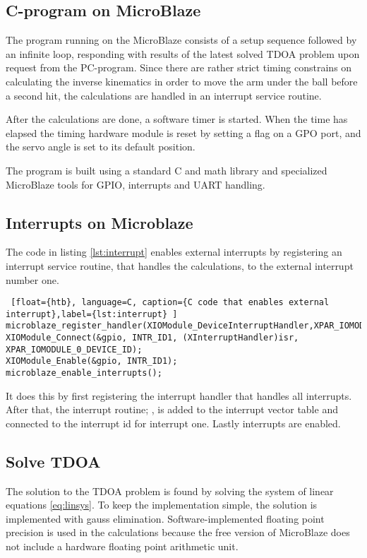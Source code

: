 \subsection{C-program on MicroBlaze}
The program running on the MicroBlaze consists of a setup sequence followed by an infinite loop, responding with results of the latest solved TDOA problem upon request from the PC-program. Since there are rather strict timing constrains on calculating the inverse kinematics in order to move the arm under the ball before a second hit, the calculations are handled in an interrupt service routine.

After the calculations are done, a software timer is started. When the time has elapsed the timing hardware module is reset by setting a flag on a GPO port, and the servo angle is set to its default position.

The program is built using a standard C and math library and specialized MicroBlaze tools for GPIO, interrupts and UART handling.
%
\subsection{Interrupts on Microblaze}
The code in listing \ref{lst:interrupt} enables external interrupts by registering an interrupt service routine, that handles the calculations, to the external interrupt number one.
%
\begin{lstlisting} [float={htb}, language=C, caption={C code that enables external interrupt},label={lst:interrupt} ]
microblaze_register_handler(XIOModule_DeviceInterruptHandler,XPAR_IOMODULE_0_DEVICE_ID);
XIOModule_Connect(&gpio, INTR_ID1, (XInterruptHandler)isr, XPAR_IOMODULE_0_DEVICE_ID);
XIOModule_Enable(&gpio, INTR_ID1);
microblaze_enable_interrupts();
\end{lstlisting}
It does this by first registering the interrupt handler that handles all interrupts. After that, the interrupt routine; , is added to the interrupt vector table and connected to the interrupt id for interrupt one. Lastly interrupts are enabled.%
%
\subsection{Solve TDOA}
The solution to the TDOA problem is found by solving the system of linear equations \eqref{eq:linsys}. To keep the implementation simple, the solution is implemented with gauss elimination. Software-implemented floating point precision is used in the calculations because the free version of MicroBlaze does not include a hardware floating point arithmetic unit.

